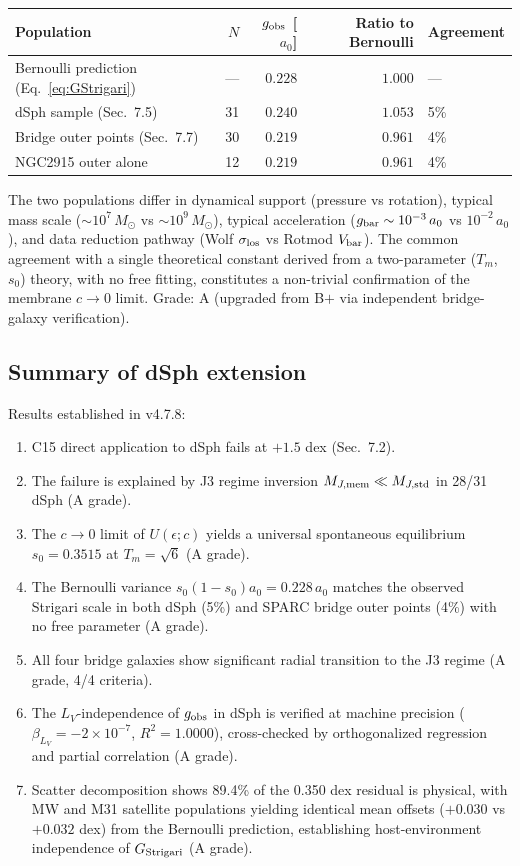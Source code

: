 \documentclass[11pt,a4paper]{article}
\newcommand{\e}[1]{\times 10^{#1}}
\newcommand{\gobs}{g_{\rm obs}}
\newcommand{\gbar}{g_{\rm bar}}
\newcommand{\ao}{a_{0}}
\newcommand{\Tm}{T_{m}}
\newcommand{\so}{s_{0}}
\newcommand{\siglos}{\sigma_{\rm los}}
\newcommand{\LV}{L_{V}}
\newcommand{\Mjmem}{M_{J,{\rm mem}}}
\newcommand{\Mjstd}{M_{J,{\rm std}}}
\newcommand{\Gstr}{G_{\rm Strigari}}
\begin{document}
\begin{center}\small
\begin{tabular}{@{}lrrrl@{}}
\toprule
Population & $N$ & $\gobs$ [$\ao$] & Ratio to Bernoulli & Agreement \\
\midrule
Bernoulli prediction (Eq.~\ref{eq:GStrigari}) & --- & $0.228$ & $1.000$ & --- \\
dSph sample (Sec.~7.5) & 31 & $0.240$ & $1.053$ & 5\% \\
Bridge outer points (Sec.~7.7) & 30 & $0.219$ & $0.961$ & 4\% \\
NGC2915 outer alone & 12 & $0.219$ & $0.961$ & 4\% \\
\bottomrule
\end{tabular}
\end{center}

The two populations differ in dynamical support (pressure vs rotation), typical mass scale
($\sim 10^7\,M_\odot$ vs $\sim 10^9\,M_\odot$), typical acceleration ($\gbar \sim 10^{-3}\,\ao$ vs
$10^{-2}\,\ao$), and data reduction pathway (Wolf $\siglos$ vs Rotmod $V_{\rm bar}$). The common agreement
with a single theoretical constant derived from a two-parameter ($\Tm$, $\so$) theory, with no free fitting,
constitutes a non-trivial confirmation of the membrane $c \to 0$ limit. Grade: A (upgraded from B$+$ via
independent bridge-galaxy verification).

\subsection{Summary of dSph extension}
Results established in v4.7.8:
\begin{enumerate}[leftmargin=*,itemsep=2pt,label=(\roman*)]
\item C15 direct application to dSph fails at $+1.5$ dex (Sec.~7.2).
\item The failure is explained by J3 regime inversion $\Mjmem \ll \Mjstd$ in 28/31 dSph (A grade).
\item The $c \to 0$ limit of $U(\epsilon; c)$ yields a universal spontaneous equilibrium $\so = 0.3515$ at
$\Tm = \sqrt{6}$ (A grade).
\item The Bernoulli variance $\so(1 - \so)\ao = 0.228\,\ao$ matches the observed Strigari scale in both
dSph (5\%) and SPARC bridge outer points (4\%) with no free parameter (A grade).
\item All four bridge galaxies show significant radial transition to the J3 regime (A grade, 4/4 criteria).
\item The $\LV$-independence of $\gobs$ in dSph is verified at machine precision
($\beta_{\LV} = -2\e{-7}$, $R^2 = 1.0000$), cross-checked by orthogonalized regression and partial
correlation (A grade).
\item Scatter decomposition shows 89.4\% of the 0.350 dex residual is physical, with MW and M31 satellite
populations yielding identical mean offsets ($+0.030$ vs $+0.032$ dex) from the Bernoulli prediction,
establishing host-environment independence of $\Gstr$ (A grade).
\end{enumerate}
\end{document}
